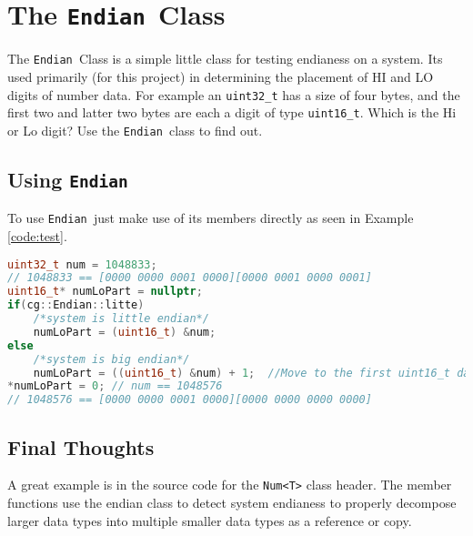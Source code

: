 \documentclass{article}
\newlength\tdima \newlength\tdimb \setlength\tdima{ \fboxsep+\fboxrule} \setlength\tdimb{-\fboxsep+\fboxrule}
\newcommand{\theobj}{\protect\Verb+Endian +}
\begin{document}
\tableofcontents




\captionsetup[lstlisting]{format=listing,labelfont=white,textfont=white}
\lstset{style=cppstyle}

\section{The \theobj Class}

The \theobj Class is a simple little class for testing endianess on a system. Its used primarily (for this project) in determining the placement of HI and LO digits of number data.  For example an \Verb+uint32_t+ has a size of four bytes, and the first two and latter two bytes are each a digit of type \Verb+uint16_t+.  Which is the Hi or Lo digit? Use the \theobj class to find out.

\subsection{Using \theobj}

To use \theobj just make use of its members directly as seen in Example \vref{code:test}.

\begin{lstlisting}[language=C++, label=code:test, caption=Testing Endianess]
uint32_t num = 1048833;  
// 1048833 == [0000 0000 0001 0000][0000 0001 0000 0001] 
uint16_t* numLoPart = nullptr; 
if(cg::Endian::litte)
	/*system is little endian*/
	numLoPart = (uint16_t) &num;
else
	/*system is big endian*/
	numLoPart = ((uint16_t) &num) + 1;  //Move to the first uint16_t data plus 1 unit of uint16_t in the significance direction.
*numLoPart = 0; // num == 1048576
// 1048576 == [0000 0000 0001 0000][0000 0000 0000 0000] 
\end{lstlisting}

\subsection{Final Thoughts}

A great example is in the source code for the \Verb+Num<T>+ class header. The member functions use the endian class to detect system endianess to properly decompose larger data types into multiple smaller data types as a reference or copy.
\end{document}
